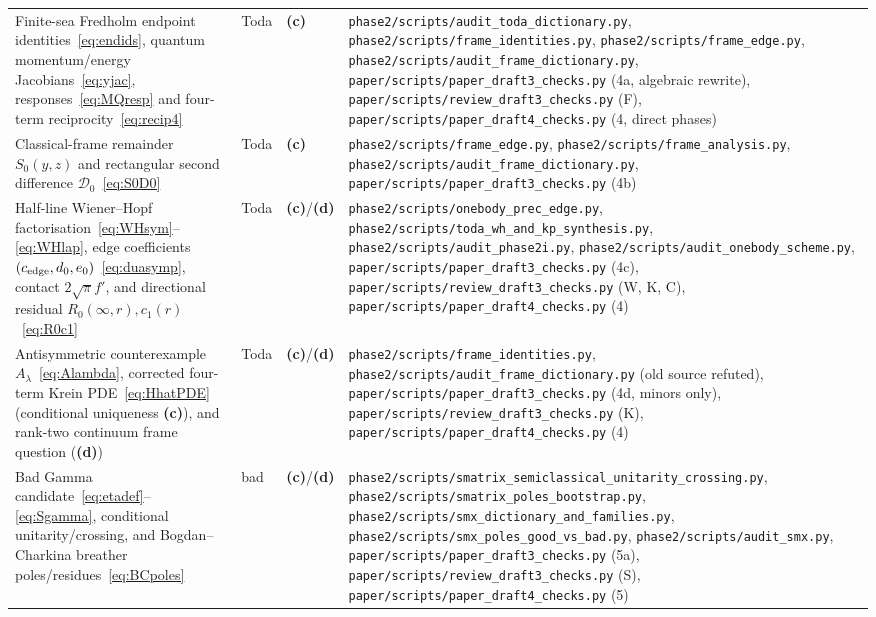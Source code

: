 \documentclass[11pt,a4paper]{article}
\newcommand{\lab}[1]{{\normalfont\sffamily\footnotesize\bfseries(#1)}}
\newcommand{\Lc}{\lab{c}}
\newcommand{\Ld}{\lab{d}}
\newcommand{\scr}[1]{\nolinkurl{#1}}
\theoremstyle{remark}
\begin{document}
\begin{longtable}{@{}>{\raggedright}p{5.4cm}>{\raggedright}p{1.3cm}>{\raggedright}p{0.75cm}>{\raggedright\arraybackslash}p{6.55cm}@{}}
Finite-sea Fredholm endpoint identities~\eqref{eq:endids}, quantum momentum/energy Jacobians~\eqref{eq:yjac}, responses~\eqref{eq:MQresp} and four-term reciprocity~\eqref{eq:recip4} & Toda & \Lc & \scr{phase2/scripts/audit_toda_dictionary.py}, \scr{phase2/scripts/frame_identities.py}, \scr{phase2/scripts/frame_edge.py}, \scr{phase2/scripts/audit_frame_dictionary.py}, \scr{paper/scripts/paper_draft3_checks.py} (4a, algebraic rewrite), \nolinkurl{paper/scripts/review_draft3_checks.py} (F), \nolinkurl{paper/scripts/paper_draft4_checks.py} (4, direct phases)\\
Classical-frame remainder $S_0(y,z)$ and rectangular second difference $\mathcal D_0$~\eqref{eq:S0D0} & Toda & \Lc & \scr{phase2/scripts/frame_edge.py}, \scr{phase2/scripts/frame_analysis.py}, \scr{phase2/scripts/audit_frame_dictionary.py}, \scr{paper/scripts/paper_draft3_checks.py} (4b)\\
Half-line Wiener--Hopf factorisation~\eqref{eq:WHsym}--\eqref{eq:WHlap}, edge coefficients $(c_{\rm edge},d_0,e_0)$~\eqref{eq:duasymp}, contact $2\sqrt\pi f'$, and directional residual $R_0(\infty,r),c_1(r)$~\eqref{eq:R0c1} & Toda & \Lc/\Ld & \scr{phase2/scripts/onebody_prec_edge.py}, \scr{phase2/scripts/toda_wh_and_kp_synthesis.py}, \scr{phase2/scripts/audit_phase2i.py}, \scr{phase2/scripts/audit_onebody_scheme.py}, \scr{paper/scripts/paper_draft3_checks.py} (4c), \nolinkurl{paper/scripts/review_draft3_checks.py} (W, K, C), \nolinkurl{paper/scripts/paper_draft4_checks.py} (4)\\
Antisymmetric counterexample $A_\lambda$~\eqref{eq:Alambda}, corrected four-term Krein PDE~\eqref{eq:HhatPDE} (conditional uniqueness \Lc), and rank-two continuum frame question (\Ld) & Toda & \Lc/\Ld & \scr{phase2/scripts/frame_identities.py}, \scr{phase2/scripts/audit_frame_dictionary.py} (old source refuted), \scr{paper/scripts/paper_draft3_checks.py} (4d, minors only), \nolinkurl{paper/scripts/review_draft3_checks.py} (K), \nolinkurl{paper/scripts/paper_draft4_checks.py} (4)\\
Bad Gamma candidate~\eqref{eq:etadef}--\eqref{eq:Sgamma}, conditional unitarity/crossing, and Bogdan--Charkina breather poles/residues~\eqref{eq:BCpoles} & bad & \Lc/\Ld & \scr{phase2/scripts/smatrix_semiclassical_unitarity_crossing.py}, \scr{phase2/scripts/smatrix_poles_bootstrap.py}, \scr{phase2/scripts/smx_dictionary_and_families.py}, \scr{phase2/scripts/smx_poles_good_vs_bad.py}, \scr{phase2/scripts/audit_smx.py}, \scr{paper/scripts/paper_draft3_checks.py} (5a), \nolinkurl{paper/scripts/review_draft3_checks.py} (S), \nolinkurl{paper/scripts/paper_draft4_checks.py} (5)\\

\end{longtable}
\end{document}
